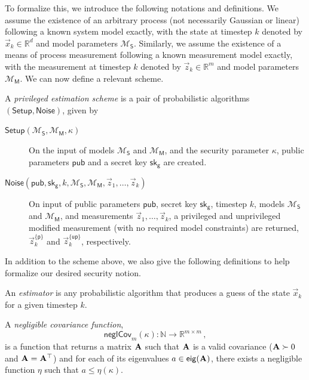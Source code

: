To formalize this, we introduce the following notations and definitions. We assume the existence of an arbitrary process (not necessarily Gaussian or linear) following a known system model exactly, with the state at timestep $k$ denoted by $\vec{x}_k\in\mathbb{R}^d$ and model parameters $\mathcal{M}_{\mathsf{S}}$. Similarly, we assume the existence of a means of process measurement following a known measurement model exactly, with the measurement at timestep $k$ denoted by $\vec{z}_k\in\mathbb{R}^m$ and model parameters $\mathcal{M}_{\mathsf{M}}$. We can now define a relevant scheme.
\begin{definition}
    A \textit{privileged estimation scheme} is a pair of probabilistic algorithms $(\mathsf{Setup},\mathsf{Noise})$, given by
    \begin{description}
        \item[$\mathsf{Setup}(\mathcal{M}_{\mathsf{S}}, \mathcal{M}_{\mathsf{M}}, \kappa)$] On the input of models $\mathcal{M}_{\mathsf{S}}$ and $\mathcal{M}_{\mathsf{M}}$, and the security parameter $\kappa$, public parameters $\mathsf{pub}$ and a secret key $\mathsf{sk}_{\mathsf{g}}$ are created.
        \item[$\mathsf{Noise}(\mathsf{pub}, \mathsf{sk}_{\mathsf{g}}, k, \mathcal{M}_{\mathsf{S}}, \mathcal{M}_{\mathsf{M}}, \vec{z}_1, \dots, \vec{z}_k)$] On input of public parameters $\mathsf{pub}$, secret key $\mathsf{sk}_{\mathsf{g}}$, timestep $k$, models $\mathcal{M}_{\mathsf{S}}$ and $\mathcal{M}_{\mathsf{M}}$, and measurements $\vec{z}_1,\dots,\vec{z}_k$, a privileged and unprivileged modified measurement (with no required model constraints) are returned, $\vec{z}_k^{\{\mathsf{p}\}}$ and $\vec{z}_k^{\{\mathsf{up}\}}$, respectively.
    \end{description}
\end{definition}
In addition to the scheme above, we also give the following definitions to help formalize our desired security notion.
\begin{definition}\label{def:priv_estimation:crypto_estimator}
    An \textit{estimator} is any probabilistic algorithm that produces a guess of the state $\vec{x}_k$ for a given timestep $k$.
\end{definition}
\begin{definition}\label{def:priv_estimation:negligible_covariance}
    A \textit{negligible covariance function},
    \begin{equation}
        \mathsf{neglCov}_m(\kappa):\mathbb{N}\rightarrow \mathbb{R}^{m\times m}\,,
    \end{equation}
    is a function that returns a matrix ${{\mathbf{A}}}$ such that ${{\mathbf{A}}}$ is a valid covariance (${{\mathbf{A}}}\succ 0$ and ${{\mathbf{A}}}={{\mathbf{A}}}^\top$) and for each of its eigenvalues $a\in\mathsf{eig}({{\mathbf{A}}})$, there exists a negligible function \cite[Def. 3.4]{katzIntroductionModernCryptography2008} $\eta$ such that $a\leq\eta(\kappa)$.
\end{definition}

